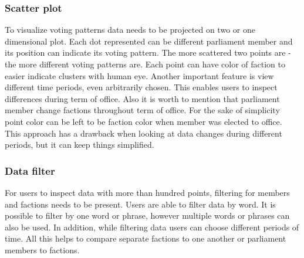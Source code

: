 \documentclass[a4paper,12pt]{article}
\begin{document}
	\subsubsection{Scatter plot}
	
	To visualize voting patterns data needs to be projected on two or one dimensional plot. Each dot represented can be different parliament member and its position can indicate its voting pattern. The more scattered two points are - the more different voting patterns are. Each point can have color of faction to easier indicate clusters with human eye. Another important feature is view different time periods, even arbitrarily chosen. This enables users to inspect differences during term of office.   
	Also it is worth to mention that parliament member change factions throughout term of office. For the sake of simplicity point color can be left to be faction color when member was elected to office. This approach has a drawback when looking at data changes during different periods, but it can keep things simplified.
	
	\subsubsection{Data filter}
	
	For users to inspect data with more than hundred points, filtering for members and factions needs to be present. Users are able to filter data by word. It is possible to filter by one word or phrase, however multiple words or phrases can also be used. In addition, while filtering data users can choose different periods of time. All this helps to compare separate factions to one another or parliament members to factions.
	
	\clearpage
	
\end{document}
